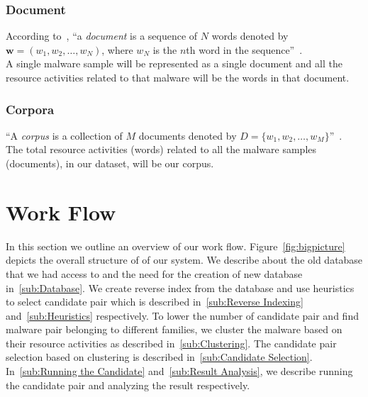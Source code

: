 \subsubsection{Document}
According to~\citeauthor{Blei}, ``a \emph{document} is a sequence of $N$ words denoted by $\textbf{w} = (w_1,w_2,\ldots,w_N)$, where $w_N$ is the $n$th word in the sequence''~\cite[]{Blei}.\\
A single malware sample will be represented as a single document and all the resource activities related to that malware will be the words in that document.
\label{ssub:Document}
\subsubsection{Corpora}
\label{ssub:Corpora}
``A \emph{corpus} is a collection of $M$ documents denoted by $D = \{w_1,w_2,\ldots,w_M\}$''~\cite[]{Blei}.\\
The total resource activities (words) related to all the malware samples (documents), in our dataset, will be our corpus.\\

\section{Work Flow}
\label{sec:Work Flow}
In this section we outline an overview of our work flow.
Figure~\ref{fig:bigpicture} depicts the overall structure of of our system.
We describe about the old database that we had access to and the need for the creation of new database in~\autoref{sub:Database}.
We create reverse index from the database and use heuristics to select candidate pair which is described in~\autoref{sub:Reverse Indexing} and~\autoref{sub:Heuristics} respectively.
To lower the number of candidate pair and find malware pair belonging to different families, we cluster the malware based on their resource activities as described in~\autoref{sub:Clustering}.
The candidate pair selection based on clustering is described in~\autoref{sub:Candidate Selection}.
In~\autoref{sub:Running the Candidate} and~\autoref{sub:Result Analysis}, we describe running the candidate pair and analyzing the result respectively.
